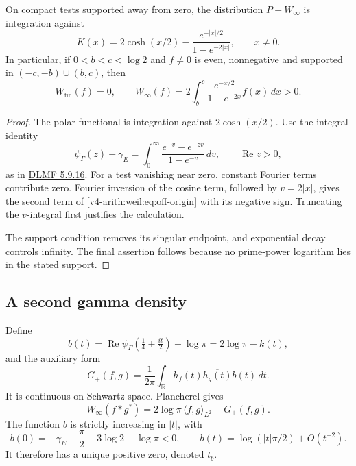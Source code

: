 \begin{proposition}
\label{v4-arith:weil:prop:off-origin}
On compact tests supported away from zero, the distribution
\(P-W_\infty\) is integration against
\begin{equation}
 K(x)=2\cosh(x/2)-\frac{e^{-|x|/2}}{1-e^{-2|x|}},
                      \qquad x\ne0.
 \label{v4-arith:weil:eq:off-origin}
\end{equation}
In particular, if \(0<b<c<\log2\) and \(f\ne0\) is even,
nonnegative and supported in \((-c,-b)\cup(b,c)\), then
\[
 W_{\mathrm{fin}}(f)=0,\qquad
 W_\infty(f)=2\int_b^c
              \frac{e^{-x/2}}{1-e^{-2x}}f(x)\,dx>0.
\]
\end{proposition}
\begin{proof}
The polar functional is integration against \(2\cosh(x/2)\).
Use the integral identity
\[
 \psi_\Gamma(z)+\gamma_E
       =\int_0^\infty\frac{e^{-v}-e^{-zv}}{1-e^{-v}}\,dv,
                       \qquad\operatorname{Re}z>0,
\]
as in \href{https://dlmf.nist.gov/5.9.E16}{DLMF 5.9.16}.
For a test vanishing near zero, constant Fourier terms contribute
zero. Fourier inversion of the cosine term, followed by \(v=2|x|\),
gives the second term of \eqref{v4-arith:weil:eq:off-origin}
with its negative sign. Truncating the \(v\)-integral first justifies
the calculation.

The support condition removes its singular endpoint,
and exponential decay controls infinity.
The final assertion follows because no prime-power logarithm lies
in the stated support.
\end{proof}

\subsection{A second gamma density}

Define
\[
 b(t)=\operatorname{Re}\psi_\Gamma(\tfrac14+\tfrac{it}{2})+\log\pi
                   =2\log\pi-k(t),
\]
and the auxiliary form
\begin{equation}
 G_+(f,g)=\frac1{2\pi}\int_{\mathbb R}
                  h_f(t)\overline{h_g(t)}b(t)\,dt.
 \label{v4-arith:weil:eq:auxiliary}
\end{equation}
It is continuous on Schwartz space. Plancherel gives
\begin{equation}
 W_\infty(f*g^*)=
          2\log\pi\,\langle f,g\rangle_{L^2}-G_+(f,g).
 \label{v4-arith:weil:eq:auxiliary-comparison}
\end{equation}
The function \(b\) is strictly increasing in \(|t|\), with
\[
 b(0)=-\gamma_E-\frac\pi2-3\log2+\log\pi<0,\qquad
 b(t)=\log(|t|\pi/2)+O(t^{-2}).
\]
It therefore has a unique positive zero, denoted \(t_b\).

